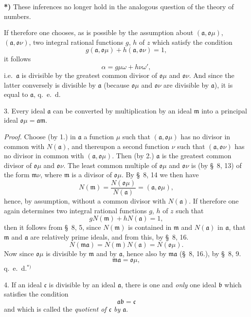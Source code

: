 \documentclass{article}
\begin{document}
\textbf{*)} These inferences no longer hold in the analogous question of the theory of numbers.

If therefore one chooses, as is possible by the assumption about $(\mathfrak{a}, \mathfrak{o}\mu)$, $(\mathfrak{a}, \mathfrak{o}\nu)$, two integral rational functions $g$, $h$ of $z$ which satisfy the condition
\[ g(\mathfrak{a}, \mathfrak{o}\mu) + h(\mathfrak{a}, \mathfrak{o}\nu) = 1, \]
it follows
\[ \alpha = g\mu\omega + h\nu\omega', \]
i.e.\ $\mathfrak{a}$ is divisible by the greatest common divisor of $\mathfrak{o}\mu$ and $\mathfrak{o}\nu$. And since the latter conversely is divisible by $\mathfrak{a}$ (because $\mathfrak{o}\mu$ and $\mathfrak{o}\nu$ are divisible by $\mathfrak{a}$), it is equal to $\mathfrak{a}$, q.\ e.\ d.

3. Every ideal $\mathfrak{a}$ can be converted by multiplication by an ideal $\mathfrak{m}$ into a principal ideal $\mathfrak{o}\mu = \mathfrak{a}\mathfrak{m}$.

\emph{Proof.} Choose (by 1.) in $\mathfrak{a}$ a function $\mu$ such that $(\mathfrak{a}, \mathfrak{o}\mu)$ has no divisor in common with $N(\mathfrak{a})$, and thereupon a second function $\nu$ such that $(\mathfrak{a}, \mathfrak{o}\nu)$ has no divisor in common with $(\mathfrak{a}, \mathfrak{o}\mu)$. Then (by 2.) $\mathfrak{a}$ is the greatest common divisor of $\mathfrak{o}\mu$ and $\mathfrak{o}\nu$. The least common multiple of $\mathfrak{o}\mu$ and $\mathfrak{o}\nu$ is (by §~8, 13) of the form $\mathfrak{m}\nu$, where $\mathfrak{m}$ is a divisor of $\mathfrak{o}\mu$. By §~8, 14 we then have
\[ N(\mathfrak{m}) = \frac{N(\mathfrak{o}\mu)}{N(\mathfrak{a})} = (\mathfrak{a}, \mathfrak{o}\mu), \]
hence, by assumption, without a common divisor with $N(\mathfrak{a})$. If therefore one again determines two integral rational functions $g$, $h$ of $z$ such that
\[ gN(\mathfrak{m}) + hN(\mathfrak{a}) = 1, \]
then it follows from §~8, 5, since $N(\mathfrak{m})$ is contained in $\mathfrak{m}$ and $N(\mathfrak{a})$ in $\mathfrak{a}$, that $\mathfrak{m}$ and $\mathfrak{a}$ are relatively prime ideals, and from this, by §~8, 16.
\[ N(\mathfrak{m}\mathfrak{a}) = N(\mathfrak{m})N(\mathfrak{a}) = N(\mathfrak{o}\mu). \]
Now since $\mathfrak{o}\mu$ is divisible by $\mathfrak{m}$ and by $\mathfrak{a}$, hence also by $\mathfrak{m}\mathfrak{a}$ (§~8, 16.), by §~8, 9.
\[ \mathfrak{m}\mathfrak{a} = \mathfrak{o}\mu, \]
q.\ e.\ d.${}^{*)}$

4. If an ideal $\mathfrak{c}$ is divisible by an ideal $\mathfrak{a}$, there is one and \emph{only} one ideal $\mathfrak{b}$ which satisfies the condition
\[ \mathfrak{a}\mathfrak{b} = \mathfrak{c} \]
and which is called the \emph{quotient of $\mathfrak{c}$ by $\mathfrak{a}$}.
\end{document}
